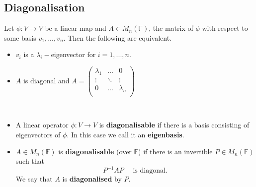 \subsection{Diagonalisation}

Let $\phi : V \rightarrow V$ be a linear map and $A \in M_n(\mathbb{F})$, the matrix of $\phi$ with respect to some basis $v_1,...,v_n$. Then the following are equivalent.
\begin{itemize}
  \item $v_i$ is a $\lambda_i-$eigenvector for $i = 1,...,n$.
  \item $A$ is diagonal and $A = \begin{pmatrix}
  \lambda_1 & \dots & 0 \\
   \vdots & \ddots & \vdots\\
   0 & \dots & \lambda_n \\ 
  \end{pmatrix}$
\end{itemize}

\begin{definition} $ $
  \begin{itemize}
  \item  A linear operator $\phi : V \rightarrow V$ is {\bf diagonalisable} if there is a basis consisting of eigenvectors of $\phi$. In this case we call it an {\bf eigenbasis}.
  \item $A \in M_n(\mathbb{F})$ is {\bf diagonalisable} (over $\mathbb{F}$) if there is an invertible $P \in M_n(\mathbb{F})$ such that
      \[P^{-1}AP \quad \text{ is diagonal}.\]
      We say that $A$ is {\bf diagonalised} by $P$.
  \end{itemize}
\end{definition}


